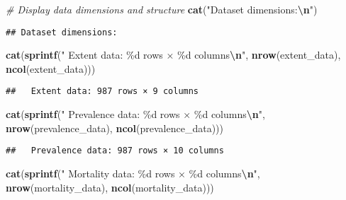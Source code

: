 \documentclass[
]{article}
\newenvironment{Shaded}{\begin{snugshade}}{\end{snugshade}}
\newcommand{\CommentTok}[1]{\textcolor[rgb]{0.56,0.35,0.01}{\textit{#1}}}
\newcommand{\FunctionTok}[1]{\textcolor[rgb]{0.13,0.29,0.53}{\textbf{#1}}}
\newcommand{\NormalTok}[1]{#1}
\newcommand{\SpecialCharTok}[1]{\textcolor[rgb]{0.81,0.36,0.00}{\textbf{#1}}}
\newcommand{\StringTok}[1]{\textcolor[rgb]{0.31,0.60,0.02}{#1}}
\begin{document}
\begin{Shaded}
\begin{Highlighting}[]
\CommentTok{\# Display data dimensions and structure}
\FunctionTok{cat}\NormalTok{(}\StringTok{"Dataset dimensions:}\SpecialCharTok{\textbackslash{}n}\StringTok{"}\NormalTok{)}
\end{Highlighting}
\end{Shaded}

\begin{verbatim}
## Dataset dimensions:
\end{verbatim}

\begin{Shaded}
\begin{Highlighting}[]
\FunctionTok{cat}\NormalTok{(}\FunctionTok{sprintf}\NormalTok{(}\StringTok{"  Extent data: \%d rows × \%d columns}\SpecialCharTok{\textbackslash{}n}\StringTok{"}\NormalTok{, }\FunctionTok{nrow}\NormalTok{(extent\_data), }\FunctionTok{ncol}\NormalTok{(extent\_data)))}
\end{Highlighting}
\end{Shaded}

\begin{verbatim}
##   Extent data: 987 rows × 9 columns
\end{verbatim}

\begin{Shaded}
\begin{Highlighting}[]
\FunctionTok{cat}\NormalTok{(}\FunctionTok{sprintf}\NormalTok{(}\StringTok{"  Prevalence data: \%d rows × \%d columns}\SpecialCharTok{\textbackslash{}n}\StringTok{"}\NormalTok{, }\FunctionTok{nrow}\NormalTok{(prevalence\_data), }\FunctionTok{ncol}\NormalTok{(prevalence\_data)))}
\end{Highlighting}
\end{Shaded}

\begin{verbatim}
##   Prevalence data: 987 rows × 10 columns
\end{verbatim}

\begin{Shaded}
\begin{Highlighting}[]
\FunctionTok{cat}\NormalTok{(}\FunctionTok{sprintf}\NormalTok{(}\StringTok{"  Mortality data: \%d rows × \%d columns}\SpecialCharTok{\textbackslash{}n}\StringTok{"}\NormalTok{, }\FunctionTok{nrow}\NormalTok{(mortality\_data), }\FunctionTok{ncol}\NormalTok{(mortality\_data)))}
\end{Highlighting}
\end{Shaded}
\end{document}
